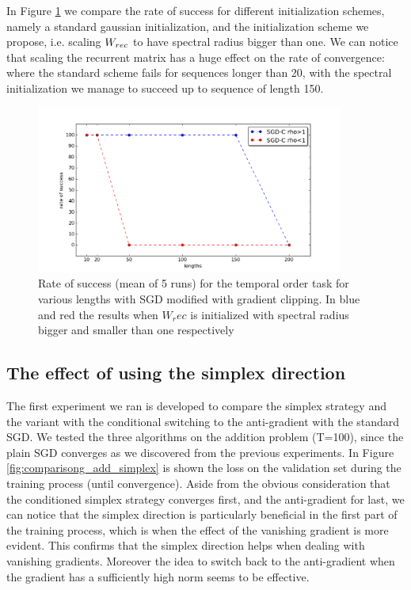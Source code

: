 In Figure \ref{fig:temporal_rates} we compare the rate of success for different initialization schemes, namely a standard gaussian initialization, and the initialization scheme we propose, i.e. scaling $W_{rec}$ to have spectral radius bigger than one. We can notice that scaling the recurrent matrix has a huge effect on the rate of convergence: where the standard scheme fails for sequences longer than 20, with the spectral initialization we manage to succeed up to sequence of length 150.


\begin{figure}
	\centering
	\includegraphics[width= 0.9\textwidth]{chapter4/temporal_rates.png}
	\caption{Rate of success (mean of 5 runs) for the temporal order task for various lengths with SGD modified with gradient clipping. In blue and red the results when $W_rec$ is initialized with spectral radius bigger and smaller than one respectively}
	\label{fig:temporal_rates}
\end{figure}



\subsection{The effect of using the simplex direction}
The first experiment we ran is developed to compare the simplex strategy and the variant with the conditional switching to the anti-gradient with the standard SGD. We tested the three algorithms on the addition problem (T=100), since the plain SGD converges as we discovered from the previous experiments. In Figure \ref{fig:comparisong_add_simplex} is shown the loss on the validation set during the training process (until convergence). Aside from the obvious consideration that the conditioned simplex strategy converges first, and the anti-gradient for last, we can notice that the simplex direction is particularly beneficial in the first part of the training process, which is when the effect of the vanishing gradient is more evident. This confirms that the simplex direction helps when dealing with vanishing gradients. Moreover the idea to switch back to the anti-gradient when the gradient has a sufficiently high norm seems to be effective.


